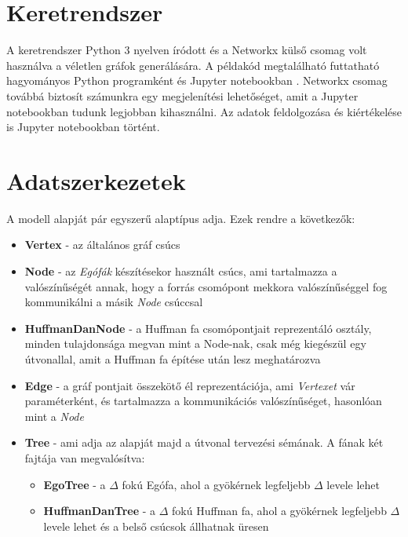 \documentclass[12pt]{report}
\begin{document}
\section{Keretrendszer}

A keretrendszer Python 3 \cite{noauthor_python_nodate} nyelven íródott és a Networkx \cite{noauthor_networkx_nodate} külső csomag volt használva a véletlen gráfok generálására.
A példakód megtalálható futtatható hagyományos Python programként és Jupyter notebookban \cite{noauthor_jupyter_nodate}.  
Networkx csomag továbbá biztosít számunkra egy megjelenítési lehetőséget, amit a Jupyter notebookban tudunk legjobban kihasználni.
Az adatok feldolgozása és kiértékelése is Jupyter notebookban történt. 

\section{Adatszerkezetek}

A modell alapját pár egyszerű alaptípus adja. Ezek rendre a következők:
\begin{itemize}
	\item \textbf{Vertex} - az általános gráf csúcs
	\item \textbf{Node} - az \textit{Egófák} készítésekor használt csúcs, ami tartalmazza a valószínűségét annak, hogy a forrás csomópont mekkora valószínűséggel fog kommunikálni a másik \textit{Node} csúccsal
	\item \textbf{HuffmanDanNode} - a Huffman fa csomópontjait reprezentáló osztály, minden tulajdonsága megvan mint a Node-nak, csak még kiegészül egy útvonallal, amit a Huffman fa építése után lesz meghatározva
	\item \textbf{Edge} - a gráf pontjait összekötő él reprezentációja, ami \textit{Vertexet} vár paraméterként, és tartalmazza a kommunikációs valószínűséget, hasonlóan mint a \textit{Node}
	\item \textbf{Tree} - ami adja az alapját majd a útvonal tervezési sémának. A fának két fajtája van megvalósítva:
	\begin{itemize}
		\item \textbf{EgoTree} - a $\Delta$ fokú Egófa, ahol a gyökérnek legfeljebb $\Delta$ levele lehet
		\item \textbf{HuffmanDanTree} - a $\Delta$ fokú Huffman fa, ahol a gyökérnek legfeljebb $\Delta$ levele lehet és a belső csúcsok állhatnak üresen
	\end{itemize}
	
	
\end{itemize}
\end{document}
